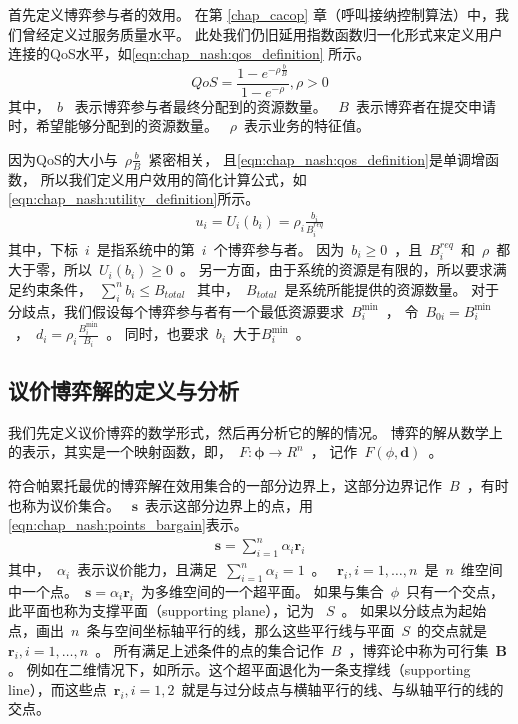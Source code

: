 首先定义博弈参与者的效用。
在第 \ref{chap_cacop} 章（呼叫接纳控制算法）中，我们曾经定义过服务质量水平。
此处我们仍旧延用指数函数归一化形式来定义用户连接的QoS水平，如\eqref{eqn:chap_nash:qos_definition} 所示。
\begin{equation}
QoS = \frac{1- e^{-\rho \frac{b}{B} }}{1-e^{-\rho}}, \rho > 0
\label{eqn:chap_nash:qos_definition}
\end{equation}
其中，~$b$~ 表示博弈参与者最终分配到的资源数量。
~$B$~表示博弈者在提交申请时，希望能够分配到的资源数量。
~$\rho$~表示业务的特征值。

因为QoS的大小与~$\rho \frac{b}{B}$~紧密相关，
且\eqref{eqn:chap_nash:qos_definition}是单调增函数，
所以我们定义用户效用的简化计算公式，如 \eqref{eqn:chap_nash:utility_definition}所示。
\begin{align}
   u_i =  U_i(b_i) = \rho_i \frac{b_i}{B_i^{req}}
    \label{eqn:chap_nash:utility_definition}
\end{align}
其中，下标~$i$~是指系统中的第~$i$~个博弈参与者。
因为~$b_i\ge 0$~，且~$B_i^{req}$~和~$\rho$~都大于零，所以~$U_i(b_i)\ge0$~。
另一方面，由于系统的资源是有限的，所以要求满足约束条件，~$\sum_i^n b_i \le B_{total}$~
其中，~$B_{total}$~是系统所能提供的资源数量。
对于分歧点，我们假设每个博弈参与者有一个最低资源要求~$B_i^{\min}$~，
令~$B_{0i} = B_i^{\min} $~，~$d_i = \rho_i \frac{B_i^{\min}}{B_i}$~。
同时，也要求~$b_i$~大于$B_i^{\min}$~。

\subsection{议价博弈解的定义与分析}
\label{subsec:chap_nash:math_analysis}

我们先定义议价博弈的数学形式，然后再分析它的解的情况。
博弈的解从数学上的表示，其实是一个映射函数，即，~$F: \mathbf{\phi} \rightarrow R^n$~，
记作~$F(\phi, \mathbf{d})$~。

符合帕累托最优的博弈解在效用集合的一部分边界上，这部分边界记作~$B$~，有时也称为议价集合。
~$\mathbf{s}$~表示这部分边界上的点，用 \eqref{eqn:chap_nash:points_bargain}表示。
\begin{align}
 \mathbf{s} = \sum_{i=1}^n \alpha_i \mathbf{r}_i
    \label{eqn:chap_nash:points_bargain}
\end{align}
其中，~$\alpha_i$~表示议价能力，且满足~$\sum_{i=1}^n \alpha_i = 1$~。
~$\mathbf{r}_i, i= 1,\dots,n$~是~$n$~维空间中一个点。~$\mathbf{s} = \alpha_i \mathbf{r}_i$~为多维空间的一个超平面。
如果与集合~$\phi$~只有一个交点，此平面也称为支撑平面（supporting plane），记为 ~$S$~。
如果以分歧点为起始点，画出~$n$~条与空间坐标轴平行的线，那么这些平行线与平面~$S$~的交点就是~$\mathbf{r}_i, i= 1,\dots,n$~。
所有满足上述条件的点的集合记作~$B$~，博弈论中称为可行集~$\mathbf{B}$。
例如在二维情况下，如所示。这个超平面退化为一条支撑线（supporting line），而这些点~$\mathbf{r}_i, i= 1,2$~就是与过分歧点与横轴平行的线、与纵轴平行的线的交点。

